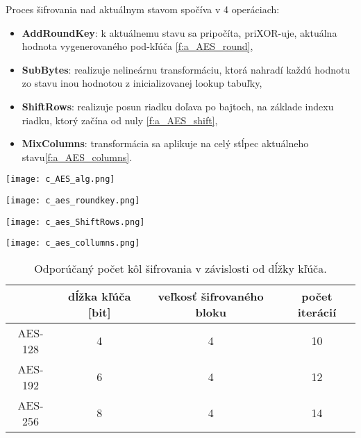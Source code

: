 \documentclass[12pt,a4paper,oneside,openright]{report}
\begin{document}
Proces šifrovania nad aktuálnym stavom spočíva v 4 operáciach:

\begin{itemize}
	\item \textbf{AddRoundKey}: k aktuálnemu stavu sa pripočíta, priXOR-uje, aktuálna hodnota vygenerovaného pod-kľúča \ref{f:a_AES_round},
	\item \textbf{SubBytes}: realizuje nelineárnu transformáciu, ktorá nahradí každú hodnotu zo stavu inou hodnotou z inicializovanej lookup tabuľky,
	\item \textbf{ShiftRows}: realizuje posun riadku doľava po bajtoch, na základe indexu riadku, ktorý začína od nuly \ref{f:a_AES_shift},
	\item \textbf{MixColumns}: transformácia sa aplikuje na celý stĺpec aktuálneho stavu\ref{f:a_AES_columns}.
\end{itemize}


\begin{figure*}[!htb]
	\centering
	\texttt{[image: c\_AES\_alg.png]}
	\caption{Algoritmus štandardu AES\cite{AESAnimation}.}
	\label{f:a_AES_animation}
\end{figure*}

\begin{figure*}[!htb]
	\centering
	\texttt{[image: c\_aes\_roundkey.png]}
	\caption{AddRoundKey\cite{AES}.}
	\label{f:a_AES_round}
\end{figure*}

\begin{figure*}[!htb]
	\centering
	\texttt{[image: c\_aes\_ShiftRows.png]}
	\caption{Operácia shift rows\cite{AES}.}
	\label{f:a_AES_shift}
\end{figure*}

\begin{figure*}[!htb]
	\centering
	\texttt{[image: c\_aes\_collumns.png]}
	\caption{MixColumns\cite{AES}.}
	\label{f:a_AES_columns}
\end{figure*}

\begin{table}
	\centering
	\caption{Odporúčaný počet kôl šifrovania v závislosti od dĺžky kľúča\cite{AES}.} 
	\label{table:AES_pocet_iteracii}
	\begin{tabular}{|c|c|c|c|}
		\hline
		 & \textbf{dĺžka kľúča} [bit] & \textbf{veľkosť šifrovaného bloku} & \textbf{počet iterácií} \\
		\hline
		AES-128 & 4 & 4 & 10\\
		\hline
		AES-192 & 6 & 4 & 12\\
		\hline
		AES-256 & 8 & 4 & 14\\
		\hline
	\end{tabular}
\end{table}
\end{document}
